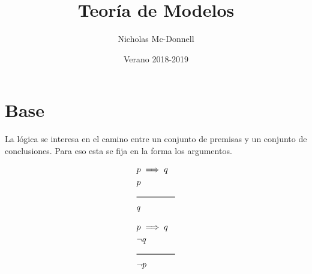 

\title{Teoría de Modelos}
\author{Nicholas Mc-Donnell}
\date{Verano 2018-2019}


\maketitle
\newpage

\tableofcontents
\newpage

\chapter{Base}
La lógica se interesa en el camino entre un conjunto de premisas y un conjunto de conclusiones. Para eso esta se fija en la forma  los argumentos.
\begin{ejm}
	\begin{align*}
		 & p\implies q          \\
		 & p                    \\
		 & \rule{1.6cm}{0.03cm} \\
		 & q
	\end{align*}
\end{ejm}
\begin{ejm}
	\begin{align*}
		 & p\implies q          \\
		 & \neg q               \\
		 & \rule{1.6cm}{0.03cm} \\
		 & \neg p
	\end{align*}
\end{ejm}
